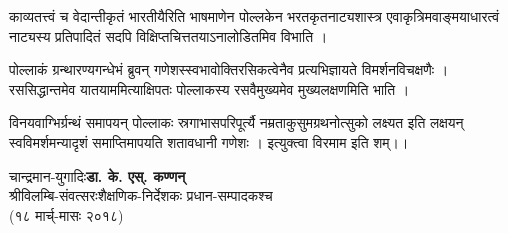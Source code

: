 {\dev काव्यतत्त्वं च वेदान्तीकृतं भारतीयैरिति भाषमाणेन पोल्लकेन भरतकृतनाट्यशास्त्र एवाकृत्रिम\-वाङ्मयाधारत्वं नाट्यस्य प्रतिपादितं सदपि विक्षिप्तचित्ततयाऽनालोडितमिव विभाति ।}

{\dev पोल्लाकं ग्रन्थारण्यगन्धेभं ब्रुवन् गणेशस्स्वभावोक्तिरसिकत्वेनैव प्रत्यभिज्ञायते विमर्शन\-विच\-क्षणैः । रससिद्धान्तमेव यातयाममित्याक्षिपतः पोल्लाकस्य रसवैमुख्यमेव मुख्यलक्षणमिति भाति ।}

\newpage

{\dev विनयवाग्भिर्ग्रन्थं समापयन् पोल्लाकः स्रगाभासपरिपूर्त्यै नम्रताकुसुमग्रथनोत्सुको लक्ष्यत इति लक्षयन् स्वविमर्शमन्यादृशं समाप्तिमापयति शतावधानी गणेशः । इत्युक्त्वा विरमाम इति शम्।।}

\bigskip
\noindent
{\dev चान्द्रमान-युगादिः}\hfill {\dev\bfseries डा. के. एस्. कण्णन्}\\
{\dev श्रीविलम्बि-संवत्सरः}\hfill {\dev शैक्षणिक-निर्देशकः प्रधान-सम्पादकश्च}\\
{\dev (१८ मार्च्-मासः २०१८)}

